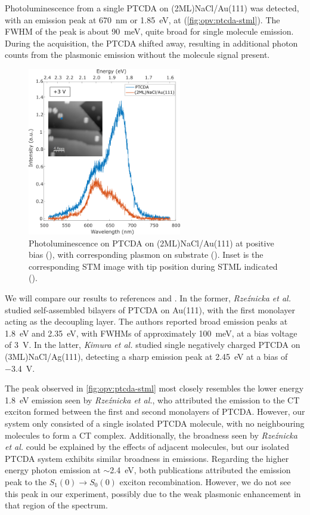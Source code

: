 Photoluminescence from a single PTCDA on (2ML)NaCl/Au(111) was detected, with an emission peak at \SI{670}{nm} or \SI{1.85}{eV}, at  (\autoref{fig:opv:ptcda-stml}). The \ac{FWHM} of the peak is about \SI{90}{meV}, quite broad for single molecule emission. During the acquisition, the PTCDA shifted away, resulting in additional photon counts from the plasmonic emission without the molecule signal present.


\begin{figure} [H]
    \centering
        \includegraphics[width=0.6\textwidth]{pictures/ptcda_+ve_emission_inset.png}
    \caption{Photoluminescence on PTCDA on (2ML)NaCl/Au(111) at positive bias (), with corresponding plasmon on substrate (). Inset is the corresponding STM image with tip position during STML indicated (). }
    \label{fig:opv:ptcda-stml}
\end{figure}

We will compare our results to references \citep{Rzeznicka2011} and \citep{Kimura2019}. In the former, \textit{Rze\'znicka et al.} studied self-assembled bilayers of PTCDA on Au(111), with the first monolayer acting as the decoupling layer. The authors reported broad emission peaks at \SI{1.8}{eV} and \SI{2.35}{eV}, with \acp{FWHM} of approximately \SI{100}{meV}, at a bias voltage of \SI{3}{V}. In the latter, \textit{Kimura et al.} studied single negatively charged PTCDA on (3ML)NaCl/Ag(111), detecting a sharp emission peak at \SI{2.45}{eV} at a bias of \SI{-3.4}{V}. 

The peak observed in \autoref{fig:opv:ptcda-stml} most closely resembles the lower energy \SI{1.8}{eV} emission seen by \textit{Rze\'znicka et al.}, who attributed the emission to the \ac{CT} exciton formed between the first and second monolayers of PTCDA. However, our system only consisted of a single isolated PTCDA molecule, with no neighbouring molecules to form a \ac{CT} complex. Additionally, the broadness seen by \textit{Rze\'znicka et al.} could be explained by the effects of adjacent molecules, but our isolated PTCDA system exhibits similar broadness in emissions. Regarding the higher energy photon emission at $\sim$\SI{2.4}{eV}, both publications attributed the emission peak to the $S_1(0) \rightarrow S_0(0)$ exciton recombination. However, we do not see this peak in our experiment, possibly due to the weak plasmonic enhancement in that region of the spectrum.

